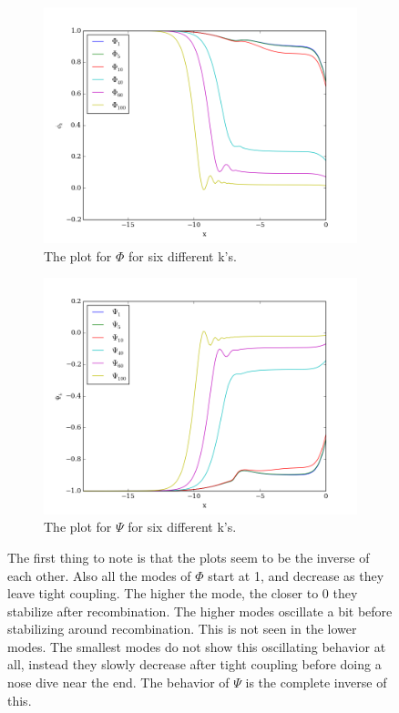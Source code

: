 \documentclass[a4paper]{report}
\begin{document}
\begin{figure}
\begin{subfigure}{.5\textwidth}
  \includegraphics[width=\textwidth]{Phi.png}
 \caption{The plot for $\Phi$ for six different k's.}
 \label{fig:Phi}
\end{subfigure}
\begin{subfigure}{.5\textwidth}
\includegraphics[width=\textwidth]{Psi.png}
 \caption{The plot for $\Psi$ for six different k's.}
 \label{fig:Psi}
\end{subfigure}
\caption{The first thing to note is that the plots seem to be the inverse of each other. Also all the modes of $\Phi$ start at 1, and decrease as they leave tight coupling. The higher the mode, the closer to 0 they stabilize after recombination. The higher modes oscillate a bit before stabilizing around recombination. This is not seen in the lower modes. The smallest modes do not show this oscillating behavior at all, instead they slowly decrease after tight coupling before doing a nose dive near the end. The behavior of $\Psi$ is the complete inverse of this.}
\end{figure}
\end{document}
